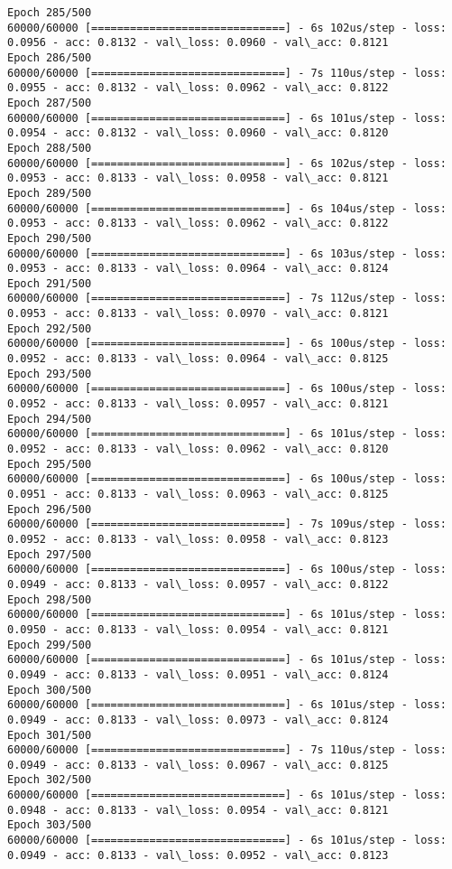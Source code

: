 \documentclass[11pt]{article}
\begin{document}
\begin{Verbatim}[commandchars=\\\{\}]
Epoch 285/500
60000/60000 [==============================] - 6s 102us/step - loss: 0.0956 - acc: 0.8132 - val\_loss: 0.0960 - val\_acc: 0.8121
Epoch 286/500
60000/60000 [==============================] - 7s 110us/step - loss: 0.0955 - acc: 0.8132 - val\_loss: 0.0962 - val\_acc: 0.8122
Epoch 287/500
60000/60000 [==============================] - 6s 101us/step - loss: 0.0954 - acc: 0.8132 - val\_loss: 0.0960 - val\_acc: 0.8120
Epoch 288/500
60000/60000 [==============================] - 6s 102us/step - loss: 0.0953 - acc: 0.8133 - val\_loss: 0.0958 - val\_acc: 0.8121
Epoch 289/500
60000/60000 [==============================] - 6s 104us/step - loss: 0.0953 - acc: 0.8133 - val\_loss: 0.0962 - val\_acc: 0.8122
Epoch 290/500
60000/60000 [==============================] - 6s 103us/step - loss: 0.0953 - acc: 0.8133 - val\_loss: 0.0964 - val\_acc: 0.8124
Epoch 291/500
60000/60000 [==============================] - 7s 112us/step - loss: 0.0953 - acc: 0.8133 - val\_loss: 0.0970 - val\_acc: 0.8121
Epoch 292/500
60000/60000 [==============================] - 6s 100us/step - loss: 0.0952 - acc: 0.8133 - val\_loss: 0.0964 - val\_acc: 0.8125
Epoch 293/500
60000/60000 [==============================] - 6s 100us/step - loss: 0.0952 - acc: 0.8133 - val\_loss: 0.0957 - val\_acc: 0.8121
Epoch 294/500
60000/60000 [==============================] - 6s 101us/step - loss: 0.0952 - acc: 0.8133 - val\_loss: 0.0962 - val\_acc: 0.8120
Epoch 295/500
60000/60000 [==============================] - 6s 100us/step - loss: 0.0951 - acc: 0.8133 - val\_loss: 0.0963 - val\_acc: 0.8125
Epoch 296/500
60000/60000 [==============================] - 7s 109us/step - loss: 0.0952 - acc: 0.8133 - val\_loss: 0.0958 - val\_acc: 0.8123
Epoch 297/500
60000/60000 [==============================] - 6s 100us/step - loss: 0.0949 - acc: 0.8133 - val\_loss: 0.0957 - val\_acc: 0.8122
Epoch 298/500
60000/60000 [==============================] - 6s 101us/step - loss: 0.0950 - acc: 0.8133 - val\_loss: 0.0954 - val\_acc: 0.8121
Epoch 299/500
60000/60000 [==============================] - 6s 101us/step - loss: 0.0949 - acc: 0.8133 - val\_loss: 0.0951 - val\_acc: 0.8124
Epoch 300/500
60000/60000 [==============================] - 6s 101us/step - loss: 0.0949 - acc: 0.8133 - val\_loss: 0.0973 - val\_acc: 0.8124
Epoch 301/500
60000/60000 [==============================] - 7s 110us/step - loss: 0.0949 - acc: 0.8133 - val\_loss: 0.0967 - val\_acc: 0.8125
Epoch 302/500
60000/60000 [==============================] - 6s 101us/step - loss: 0.0948 - acc: 0.8133 - val\_loss: 0.0954 - val\_acc: 0.8121
Epoch 303/500
60000/60000 [==============================] - 6s 101us/step - loss: 0.0949 - acc: 0.8133 - val\_loss: 0.0952 - val\_acc: 0.8123

\end{Verbatim}
\end{document}
